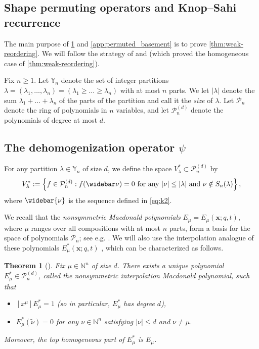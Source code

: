 \documentclass[12pt]{amsart}
\newtheorem{thm}{Theorem}[section]
\theoremstyle{definition}
\newcommand{\bfx}{\boldsymbol{x}}
\newcommand{\mcP}{\mathcal P}
\newcommand{\VV}{V_{\lambda}^*}
\newcommand{\NN}{\mathbb N}
\newcommand{\YY}{\mathbb Y}
\begin{document}
\begin{appendices}
    
\section{Shape permuting operators and Knop–Sahi recurrence}\label{app:shape_permuting}
The main purpose of \cref{app:shape_permuting} and \cref{app:permuted_basement} is to prove \cref{thm:weak-reordering}. We will follow the strategy of \cite{AlexanderssonSawhney2019} and \cite{AyyerMartinWilliams2025} (which proved the homogeneous case of \cref{thm:weak-reordering}). 

Fix $n\geq 1$. Let $\YY_n$ denote the set of integer partitions 
$\lambda=(\lambda_1,\dots,\lambda_n)=(\lambda_1 \geq \dots \geq \lambda_n)$ with at most $n$ parts.  We let $|\lambda|$ denote the sum $\lambda_1+ \dots + \lambda_n$ of the parts of the partition and call it the \emph{size} of $\lambda$.
Let $\mcP_n$ denote the ring of polynomials in $n$ variables, and 
let $\mcP_n^{(d)}$ denote the polynomials of degree at most $d$. 


\subsection{The dehomogenization operator \texorpdfstring{$\psi$}{psi}}
For any partition $\lambda\in\YY_n$ of size $d$, we define the space $\VV\subset\mcP^{(d)}_n$ by
$$\VV:=\left\{f\in \mcP_n^{(d)}: f(\widebar\nu)=0 \text{ for any $|\nu|\leq |\lambda|$ and $\nu\notin S_n(\lambda)$}\right\},$$
where $\widebar{\nu}$ is the sequence defined in \cref{eq:k2}.

We recall that the \textit{nonsymmetric Macdonald polynomials} $E_{\mu} = E_\mu(\bfx;q,t)$, where $\mu$ ranges over all compositions with at most $n$ parts, form a basis for the space of polynomials $\mcP_n$; see e.g. \cite{HaglundHaimanLoehr2008}. 
We will also use the interpolation analogue of these polynomials $E^*_\mu(\bfx;q,t)$ \cite{Knop1997b,Sahi1996}, which can be characterized as follows. 
\begin{thm}[\cite{Knop1997b,Sahi1996}]\label{thm:Knop_Sahi}
    Fix $\mu\in \NN^n$ of size $d$. There exists a unique polynomial $E^*_\mu\in\mcP_n^{(d)}$, called the \emph{nonsymmetric interpolation Macdonald polynomial}, such that
    \begin{itemize}
        \item $[x^\mu]E^*_\mu=1$ (so in particular, $E^*_{\mu}$ has degree $d$),
        \item $E^*_\mu(\widetilde\nu)=0$ for any $\nu\in \NN^n$ satisfying $|\nu|\leq d$ and $\nu\neq \mu$.
    \end{itemize}
    Moreover, the top homogeneous part of $E^*_\mu$ is  $E_\mu$.
\end{thm}


\end{appendices}
\end{document}
